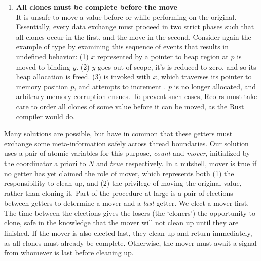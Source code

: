 \begin{enumerate}
	\item \textbf{All clones must be complete before the move}\\
	 It is unsafe to move a value before or while performing  on the original. Essentially, every data exchange must proceed in two strict phases such that all clones occur in the first, and the move in the second.
	 Consider again the example of type  by examining this sequence of events that results in undefined behavior: (1)  $x$ represented by a pointer to heap region at $p$ is moved to binding $y$. (2) $y$ goes out of scope, it's  is reduced to zero, and so its heap allocation is freed. (3)  is invoked with $x$, which traverses its pointer to memory position $p$, and attempts to increment . $p$ is no longer allocated, and arbitrary memory corruption ensues. To prevent such cases, Reo-rs must take care to order all clones of some value before it can be moved, as the Rust compiler would do.
\end{enumerate}

Many solutions are possible, but have in common that these getters must exchange some meta-information safely across thread boundaries. Our solution uses a pair of atomic variables for this purpose, \textit{count} and \textit{mover}, initialized by the coordinator a priori to $N$ and $true$ respectively. In a nutshell, mover is true if no getter has yet claimed the role of mover, which represents both (1) the responsibility to clean up, and (2) the privilege of moving the original value, rather than cloning it. Part of the procedure at large is a pair of elections between getters to determine a mover and a \textit{last} getter. We elect a mover first. The time between the elections gives the losers (the `cloners') the opportunity to clone, safe in the knowledge that the mover will not clean up until they are finished. If the mover is also elected last, they clean up and return immediately, as all clones must already be complete. Otherwise, the mover must await a signal from whomever is last before cleaning up.

